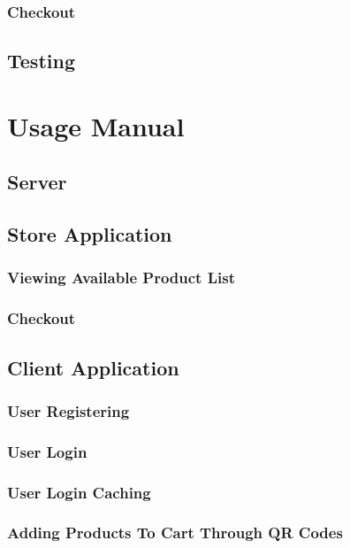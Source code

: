 \documentclass[12pt]{article}
\begin{document}
\subsubsection{Checkout}

\subsection{Testing}

\pagebreak
\section{Usage Manual}

\subsection{Server}

\subsection{Store Application}
\subsubsection{Viewing Available Product List}

\subsubsection{Checkout}

\subsection{Client Application}
\subsubsection{User Registering}

\subsubsection{User Login}

\subsubsection{User Login Caching}

\subsubsection{Adding Products To Cart Through QR Codes}
\end{document}
